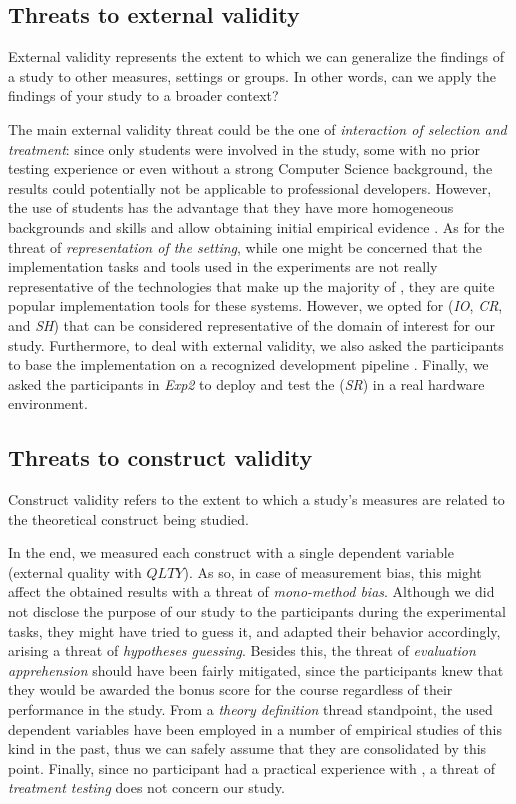 \subsection{Threats to external validity}
External validity represents the extent to which we can generalize the findings of a study to other measures, settings or groups. In other words, can we apply the findings of your study to a broader context?

The main external validity threat could be the one of \textit{interaction of selection and treatment}: since only students were involved in the study, some with no prior testing experience or even without a strong Computer Science background, the results could potentially not be applicable to professional developers. 
However, the use of students has the advantage that they have more homogeneous backgrounds and skills and allow obtaining initial empirical evidence \cite{DBLP:conf/metrics/CarverJMS03, DBLP:journals/ese/HostRW00}.
As for the threat of \textit{representation of the setting}, while one might be concerned that the implementation tasks and tools used in the experiments are not really representative of the technologies that make up the majority of \ess, they are quite popular implementation tools for these systems. 
However, we opted for \ess (\ie \textit{IO}, \textit{CR}, and \textit{SH}) that can be considered representative of the domain of interest for our study. Furthermore, to deal with external validity, we also asked the participants to base the \ess implementation on a recognized development pipeline \cite{TDDEC}. Finally, we asked the participants in \textit{Exp2} to deploy and test the \es (\ie \textit{SR}) in a real hardware environment.

\subsection{Threats to construct validity}
Construct validity refers to the extent to which a study's measures are related to the theoretical construct being studied.

In the end, we measured each construct with a single dependent variable (\eg external quality with $QLTY$). As so, in case of measurement bias,
this might affect the obtained results with a threat of \textit{mono-method bias}. 
Although we did not disclose the purpose of our study to the participants during the experimental tasks, they might have tried to guess it, and adapted their behavior accordingly, arising a threat of \textit{hypotheses guessing}. 
Besides this, the threat of \textit{evaluation apprehension} should have been fairly mitigated, since the participants knew that they would be awarded the bonus score for the course regardless of their performance in the study.
From a \textit{theory definition} thread standpoint, the used dependent variables have been employed in a number of empirical studies of this kind in the past, thus we can safely assume that they are consolidated by this point. Finally, since no participant had a practical experience with \tdd, a threat of \textit{treatment testing} does not concern our study.

